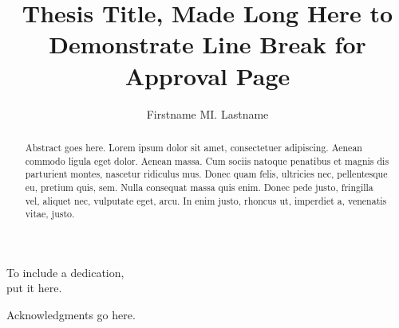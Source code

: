 \documentclass[11pt]{WSU_thesis}
\begin{document}
\title{Thesis Title, Made Long Here to Demonstrate Line Break for Approval Page}
\author{Firstname MI. Lastname}
\deanlinethree{}

\begin{frontmatter}

\maketitle
\approvalpage

\begin{abstract}
Abstract goes here. Lorem ipsum dolor sit amet, consectetuer adipiscing. Aenean 
commodo ligula eget dolor. Aenean massa. Cum sociis natoque penatibus et magnis 
dis parturient montes, nascetur ridiculus mus. Donec quam felis, ultricies nec, 
pellentesque eu, pretium quis, sem. Nulla consequat massa quis enim. Donec pede 
justo, fringilla vel, aliquet nec, vulputate eget, arcu. In enim justo, rhoncus 
ut, imperdiet a, venenatis vitae, justo.
\end{abstract}

\tableofcontents
\listoffigures
\listoftables
\newpage

\begin{dedication}
\null\vfil
{\large
\begin{center}
To include a dedication,\\\vspace{12pt}
put it here.
\end{center}}
\vfil\null
\end{dedication}


\begin{acknowledgements}
Acknowledgments go here.
\end{acknowledgements}

\end{frontmatter}
\doublespacing
\end{document}
